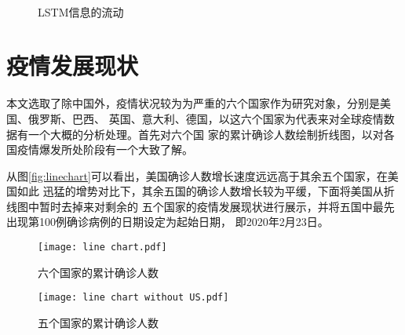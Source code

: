 \documentclass[lang=cn,12pt,a4paper,cite=authoryear]{elegantpaper}
\begin{document}
\begin{figure}[htp]
	\centering
	\\
    \caption{LSTM信息的流动}
	\label{fig:LSTM}
\end{figure}

\section{疫情发展现状}

本文选取了除中国外，疫情状况较为为严重的六个国家作为研究对象，分别是美国、俄罗斯、巴西、
英国、意大利、德国，以这六个国家为代表来对全球疫情数据有一个大概的分析处理。首先对六个国
家的累计确诊人数绘制折线图，以对各国疫情爆发所处阶段有一个大致了解。

从图\ref{fig:linechart}可以看出，美国确诊人数增长速度远远高于其余五个国家，在美国如此
迅猛的增势对比下，其余五国的确诊人数增长较为平缓，下面将美国从折线图中暂时去掉来对剩余的
五个国家的疫情发展现状进行展示，并将五国中最先出现第100例确诊病例的日期设定为起始日期，
即2020年2月23日。

\begin{figure}[htp]
	\centering
		\begin{minipage}{0.48\linewidth}
			\centering
			\texttt{[image: line chart.pdf]}
			\caption{六个国家的累计确诊人数}
			\label{fig:linechart}
		\end{minipage}
		\begin{minipage}{0.48\linewidth}
			\centering
			\texttt{[image: line chart without US.pdf]}
			\caption{五个国家的累计确诊人数}
			\label{fig:noUS}
		\end{minipage}
\end{figure}
\end{document}
